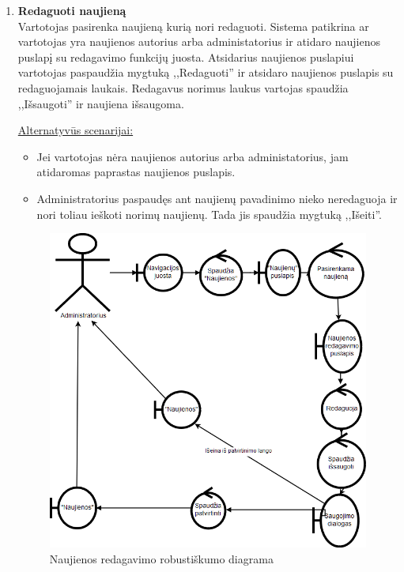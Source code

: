 \documentclass{VUMIFPSkursinis}
\begin{document}
\begin{enumerate} [label = \textbf{U\arabic*.}]
			\item \textbf{Redaguoti naujieną}   \\
					Vartotojas pasirenka naujieną kurią nori redaguoti. Sistema patikrina ar vartotojas yra naujienos autorius arba administatorius ir atidaro naujienos puslapį su redagavimo funkcijų juosta. Atsidarius naujienos puslapiui vartotojas paspaudžia mygtuką ,,Redaguoti'' ir atsidaro naujienos puslapis su redaguojamais laukais. Redagavus norimus laukus vartojas spaudžia ,,Išsaugoti'' ir naujiena išsaugoma.
					
					\underline{Alternatyvūs scenarijai:}
					\begin{itemize}
						\item Jei vartotojas nėra naujienos autorius arba administatorius, jam atidaromas paprastas naujienos puslapis.
						\item Administratorius paspaudęs ant naujienų pavadinimo nieko neredaguoja ir nori toliau ieškoti norimų naujienų. Tada jis spaudžia mygtuką ,,Išeiti''.
					\end{itemize}	
					
					\begin{figure}[H]
						\centering
						\includegraphics[width=\textwidth]{img/PSI5/u21.png}
						\caption{Naujienos redagavimo robustiškumo diagrama}
						\label{draw:u21}
					\end{figure}
			

\end{enumerate}
\end{document}
